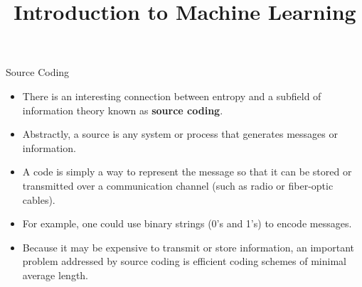 



\newcommand{\titlefigure}{figure_man/equal_decode.png}
\newcommand{\learninggoals}{
  \item \textcolor{blue}{XXX}
  \item \textcolor{blue}{XXX}
}

\title{Introduction to Machine Learning}
\date{}





\begin{vbframe} {Source Coding}
\begin{itemize}
  \item There is an interesting connection between entropy and a subfield of information theory known as \textbf{source coding}.
  \item Abstractly, a source is any system or process that generates messages or information.
  \item A code is simply a way to represent the message so that it can be stored or transmitted over a communication channel (such as radio or fiber-optic cables).
  \item For example, one could use binary strings (0's and 1's) to encode messages.
  \item Because it may be expensive to transmit or store information, an important problem addressed by source coding is efficient coding schemes of minimal average length.
\end{itemize}

\framebreak


\end{vbframe}
